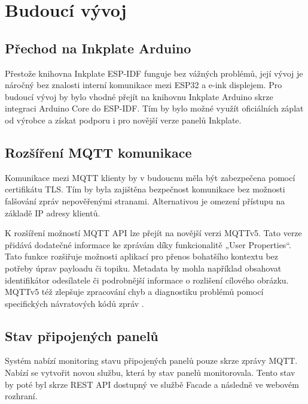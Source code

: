 \chapter{Budoucí vývoj}

\section{Přechod na Inkplate Arduino}
Přestože knihovna Inkplate ESP-IDF funguje bez vážných problémů, její vývoj je náročný bez znalosti interní komunikace mezi ESP32 a e-ink displejem. Pro budoucí vývoj by bylo vhodné přejít na knihovnu Inkplate Arduino skrze integraci Arduino Core do ESP-IDF. Tím by bylo možné využít oficiálních záplat od výrobce a získat podporu i pro novější verze panelů Inkplate.

\section{Rozšíření MQTT komunikace}
Komunikace mezi MQTT klienty by v budoucnu měla být zabezpečena pomocí certifikátu TLS. Tím by byla zajištěna bezpečnost komunikace bez možnosti falšování zpráv nepověřenými stranami. Alternativou je omezení přístupu na základě IP adresy klientů. 

K rozšíření možností MQTT API lze přejít na novější verzi MQTTv5. Tato verze přidává dodatečné informace ke zprávám díky funkcionalitě „User Properties“. Tato funkce rozšiřuje možnosti aplikací pro přenos bohatšího kontextu bez potřeby úprav payloadu či topiku. Metadata by mohla například obsahovat identifikátor odesílatele či podrobnější informace o rozlišení cílového obrázku. MQTTv5 též zlepšuje zpracování chyb a diagnostiku problémů pomocí specifických návratových kódů zpráv \cite{IntroductionMQTTProtocol2019}.

\section{Stav připojených panelů}
Systém nabízí monitoring stavu připojených panelů pouze skrze zprávy MQTT. Nabízí se vytvořit novou službu, která by stav panelů monitorovala. Tento stav by poté byl skrze REST API dostupný ve službě Facade a následně ve webovém rozhraní.
